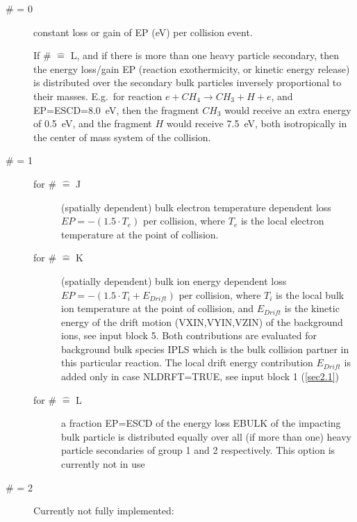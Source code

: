 \begin{description}
  \item[\# = 0] constant loss or gain of EP
        (\si{\electronvolt}) per collision event.

        If \# $\hat{=} $ L, and if there is more than one heavy particle secondary,
        then the energy loss/gain EP (reaction exothermicity, or kinetic energy
        release) is distributed over the secondary bulk particles inversely
        proportional to their masses.
        E.g.\ for reaction $e+CH_4 \rightarrow CH_3 + H + e$, and
        EP=ESCD=\SI{8.0}{\electronvolt}, then the fragment $CH_3$ would receive an
        extra energy of \SI{0.5}{\electronvolt}, and the fragment $H$ would receive
        \SI{7.5}{\electronvolt}, both isotropically in the center of mass system of the
        collision.
  \item[\# = 1] \hfill
        \begin{description}
          \item[for \# $  \hat{=} $ J]
                (spatially dependent) bulk electron temperature dependent loss $EP = -(1.5
                    \cdot  T_e)$ per collision, where $T_e$ is the local electron temperature at
                the point of collision.
          \item[for \# $	\hat{=} $ K] (spatially dependent) bulk ion energy dependent
                loss $EP = -(1.5  \cdot  T_i + E_{Drift})$ per collision, where $T_i$ is the
                local bulk ion temperature at the point of collision, and $E_{Drift}$ is the
                kinetic energy of the drift motion (VXIN,VYIN,VZIN) of the background ions, see
                input block 5.
                Both contributions are evaluated for background bulk species IPLS which is the
                bulk collision partner in this particular reaction.
                The local drift energy contribution $E_{Drift}$ is added only in case
                NLDRFT=TRUE, see input block 1 (\cref{sec2.1})
          \item[for \# $  \hat{=} $ L] a
                fraction EP=ESCD of the energy loss EBULK of the impacting bulk particle is
                distributed equally over all (if more than one) heavy particle secondaries of
                group 1 and 2 respectively.
                This option is currently not in use
        \end{description}
  \item[\# = 2] Currently
        not fully implemented:


\end{description}
